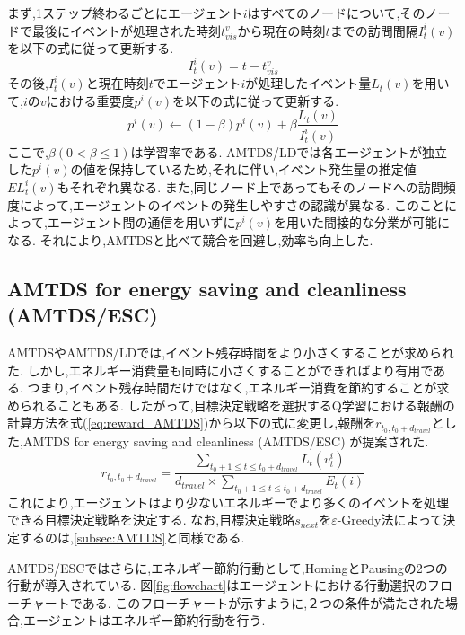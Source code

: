 \documentclass[12pt,a4j,twoside]{jarticle}
\begin{document}
  \par
  まず,1ステップ終わるごとにエージェント$i$はすべてのノードについて,そのノードで最後にイベントが処理された時刻$t^v_{vis}$から現在の時刻$t$までの訪問間隔$I^i_t(v)$を以下の式に従って更新する.
  \begin{equation}
    I^i_t(v) = t - t^v_{vis}
  \end{equation}
  その後,$I^i_t(v)$と現在時刻$t$でエージェント$i$が処理したイベント量$L_t(v)$を用いて,$i$の$v$における重要度$p^i(v)$を以下の式に従って更新する.
  \begin{equation}
    p^i(v) \gets (1 - \beta)p^i(v) + \beta \dfrac{L_t(v)}{I^i_t(v)}
  \end{equation}
  ここで,$\beta(0 < \beta \leq 1)$は学習率である.
  AMTDS/LDでは各エージェントが独立した$p^i(v)$の値を保持しているため,それに伴い,イベント発生量の推定値$EL^i_t(v)$もそれぞれ異なる.
  また,同じノード上であってもそのノードへの訪問頻度によって,エージェントのイベントの発生しやすさの認識が異なる.
  このことによって,エージェント間の通信を用いずに$p^i(v)$を用いた間接的な分業が可能になる.
  それにより,AMTDSと比べて競合を回避し,効率も向上した.

  \subsection{AMTDS for energy saving and cleanliness (AMTDS/ESC)}
  AMTDSやAMTDS/LDでは,イベント残存時間をより小さくすることが求められた.
  しかし,エネルギー消費量も同時に小さくすることができればより有用である.
  つまり,イベント残存時間だけではなく,エネルギー消費を節約することが求められることもある.
  したがって,目標決定戦略を選択するQ学習における報酬の計算方法を式(\ref{eq:reward_AMTDS})から以下の式に変更し,報酬を$r_{t_0,t_0+d_{travel}}$とした,AMTDS for energy saving and cleanliness (AMTDS/ESC) \cite{Wu2019}が提案された.
  \begin{equation}
    r_{t_0,t_0+d_{travel}} = \dfrac{\displaystyle\sum_{t_0+1 \leq t \leq t_0+d_{travel}} L_t(v^i_t)}{d_{travel} \times \displaystyle\sum_{t_0+1 \leq t \leq t_0+d_{travel}} E_t(i)}
  \end{equation}
  これにより,エージェントはより少ないエネルギーでより多くのイベントを処理できる目標決定戦略を決定する.
  なお,目標決定戦略$s_{next}$を$\varepsilon$-Greedy法によって決定するのは,\ref{subsec:AMTDS}と同様である.
  
  \par
  AMTDS/ESCではさらに,エネルギー節約行動として,HomingとPausingの2つの行動が導入されている.
  図\ref{fig:flowchart}はエージェントにおける行動選択のフローチャートである.
  このフローチャートが示すように,２つの条件が満たされた場合,エージェントはエネルギー節約行動を行う.
  
\end{document}
